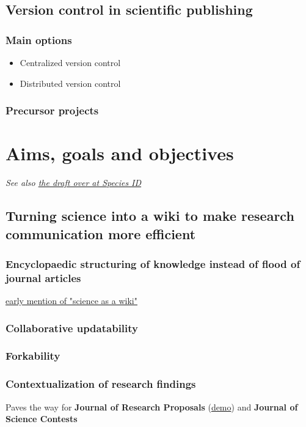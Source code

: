 \documentclass[final,authoryear,3p]{elsarticle-open-drafting}
\begin{document}
\begin{enumerate}
\subsection{Version control in scientific publishing}
\subsubsection{Main options}
\begin{itemize}
	\item Centralized version control
	\item Distributed version control
\end{itemize}
	
\subsubsection{Precursor projects}

\section{Aims, goals and objectives}
{\it See also \href{http://species-id.net/wiki/Draft:Encyclopaedia_of_original_research#Aims,_Goals_and_Objectives}{the draft over at Species ID}}

\subsection{Turning science into a wiki to make research communication more efficient}
\subsubsection{Encyclopaedic structuring of knowledge instead of flood of journal articles}

\href{http://opencontract.org/}{early mention of "science as a wiki"}

\subsubsection{Collaborative updatability}
\subsubsection{Forkability}
\subsubsection{Contextualization of research findings}
Paves the way for {\bf Journal of Research Proposals} (\href{http://iphylo.blogspot.com/2011/06/would-you-give-me-grant-experiment-in.html}{demo}) and {\bf Journal of Science Contests}


\end{enumerate}
\end{document}
